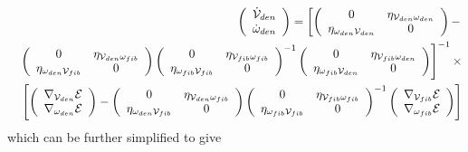 \begin{eqnarray}
&&\left( 
\begin{array}{c}
{\cal \dot{V}}_{den} \\ 
\dot{\omega}_{den}%
\end{array}%
\right) =\left[ \left( 
\begin{array}{cc}
0 & \eta _{{\cal V}_{den}\omega _{den}} \\ 
\eta _{\omega _{den}{\cal V}_{den}} & 0%
\end{array}%
\right) -\right.  \nonumber \\
&&\left. \left( 
\begin{array}{cc}
0 & \eta _{{\cal V}_{den}\omega _{fib}} \\ 
\eta _{\omega _{den}{\cal V}_{fib}} & 0%
\end{array}%
\right) \left( 
\begin{array}{cc}
0 & \eta _{{\cal V}_{fib}\omega _{fib}} \\ 
\eta _{\omega _{fib}{\cal V}_{fib}} & 0%
\end{array}%
\right) ^{-1}\left( 
\begin{array}{cc}
0 & \eta _{{\cal V}_{fib}\omega _{den}} \\ 
\eta _{\omega _{fib}{\cal V}_{den}} & 0%
\end{array}%
\right) \right] ^{-1}\times  \nonumber \\
&&\left[ \left( 
\begin{array}{c}
\nabla _{{\cal V}_{den}}{\cal E} \\ 
\nabla _{\omega _{den}}{\cal E}%
\end{array}%
\right) -\left( 
\begin{array}{cc}
0 & \eta _{{\cal V}_{den}\omega _{fib}} \\ 
\eta _{\omega _{den}{\cal V}_{fib}} & 0%
\end{array}%
\right) \left( 
\begin{array}{cc}
0 & \eta _{{\cal V}_{fib}\omega _{fib}} \\ 
\eta _{\omega _{fib}{\cal V}_{fib}} & 0%
\end{array}%
\right) ^{-1}\left( 
\begin{array}{c}
\nabla _{{\cal V}_{fib}}{\cal E} \\ 
\nabla _{\omega _{fib}}{\cal E}%
\end{array}%
\right) \right]
\end{eqnarray}%
which can be further simplified to give 
